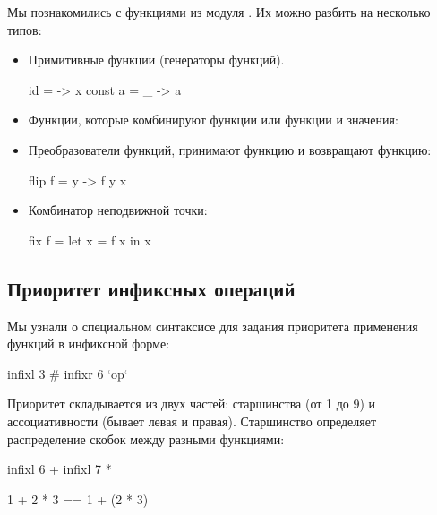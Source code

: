 Мы познакомились с функциями из модуля .
Их можно разбить на несколько типов:

\begin{itemize}

\item Примитивные функции (генераторы функций). 
        
\begin{code}
id      = \x -> x
const a = \_ -> a
\end{code}

\item Функции, которые комбинируют функции или функции и значения:
        
        
\item Преобразователи функций, принимают функцию и возвращают функцию:

\begin{code}
flip f = \x y -> f y x
\end{code}

\item Комбинатор неподвижной точки:

\begin{code}
fix f = let x = f x
        in  x
\end{code}

\end{itemize}


\subsection*{Приоритет инфиксных операций}

Мы узнали о специальном синтаксисе для задания приоритета 
применения функций в инфиксной форме:

\begin{code}
infixl 3 #
infixr 6 `op`
\end{code}

Приоритет складывается из двух частей: старшинства (от 1 до 9)
и ассоциативности (бывает левая и правая). Старшинство определяет 
распределение скобок между разными функциями:

\begin{code}
infixl 6 +
infixl 7 *

1 + 2 * 3 == 1 + (2 * 3)
\end{code}

